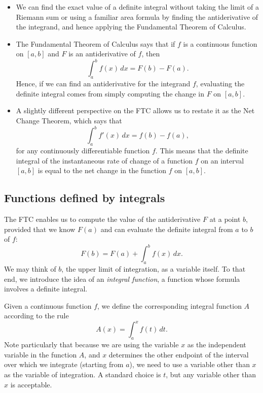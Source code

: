 \begin{itemize}
\item We can find the exact value of a definite integral without taking the limit of a Riemann sum or using a familiar area formula by finding the antiderivative of the integrand, and hence applying the Fundamental Theorem of Calculus.
\item The Fundamental Theorem of Calculus says that if $f$ is a continuous function on $[a,b]$ and $F$ is an antiderivative of $f$, then
$$\int_a^b f(x) \, dx = F(b) - F(a).$$
Hence, if we can find an antiderivative for the integrand $f$, evaluating the definite integral comes from simply computing the change in $F$ on $[a,b]$. 
\item A slightly different perspective on the FTC allows us to restate it as the Net Change Theorem, which says that
$$\int_a^b f'(x) \, dx = f(b) - f(a),$$
for any continuously differentiable function $f$.   This means that the definite integral of the instantaneous rate of change of a function $f$ on an interval $[a,b]$ is equal to the net change in the function $f$ on $[a,b]$.
\end{itemize}


\subsection{Functions defined by integrals}

The FTC enables us to compute the value of the antiderivative $F$ at a point $b$, provided that we know $F(a)$ and can evaluate the definite integral from $a$ to $b$ of $f$:
$$F(b) = F(a) + \int_a^b f(x) \, dx.$$
We may think of $b$, the upper limit of integration, as a variable itself.  To that end, we introduce the idea of an \emph{integral function}, a function whose formula involves a definite integral.

Given a continuous function $f$, we define the corresponding integral function $A$ according to the rule 
\begin{equation} \label{E:intfxn}
A(x) = \int_a^x f(t) \, dt.
\end{equation}
Note particularly that because we are using the variable $x$ as the independent variable in the function $A$, and $x$ determines the other endpoint of the interval over which we integrate (starting from $a$), we need to use a variable other than $x$ as the variable of integration.  A standard choice is $t$, but any variable other than $x$ is acceptable.

